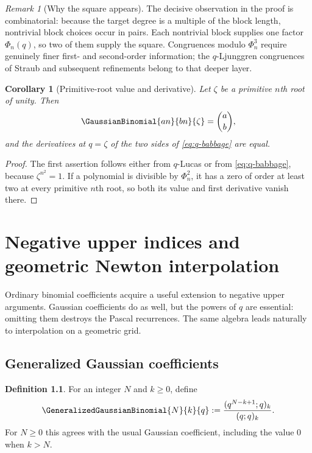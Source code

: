 \documentclass[11pt,a4paper,oneside,openany]{book}
\newtheorem{corollary}[corollary]{Corollary}
\theoremstyle{definition}
\newtheorem{definition}[definition]{Definition}
\theoremstyle{remark}
\newtheorem{remark}[remark]{Remark}
\begin{document}
\begin{remark}[Why the square appears]
The decisive observation in the proof is combinatorial: because the target degree is a multiple of the block length, nontrivial block choices occur in pairs.  Each nontrivial block supplies one factor $\Phi_n(q)$, so two of them supply the square.  Congruences modulo $\Phi_n^3$ require genuinely finer first- and second-order information; the $q$-Ljunggren congruences of Straub and subsequent refinements belong to that deeper layer.
\end{remark}

\begin{corollary}[Primitive-root value and derivative]\label{cor:babbage-derivative}
Let $\zeta$ be a primitive $n$th root of unity.  Then
\[
 \GaussianBinomial{an}{bn}{\zeta}=\binom ab,
\]
and the derivatives at $q=\zeta$ of the two sides of \eqref{eq:q-babbage} are equal.
\end{corollary}

\begin{proof}
The first assertion follows either from $q$-Lucas or from \eqref{eq:q-babbage}, because $\zeta^{n^2}=1$.  If a polynomial is divisible by $\Phi_n^2$, it has a zero of order at least two at every primitive $n$th root, so both its value and first derivative vanish there.
\end{proof}

\chapter{Negative upper indices and geometric Newton interpolation}\label{chap:qnewton}

Ordinary binomial coefficients acquire a useful extension to negative upper arguments.  Gaussian coefficients do as well, but the powers of $q$ are essential: omitting them destroys the Pascal recurrences.  The same algebra leads naturally to interpolation on a geometric grid.

\section{Generalized Gaussian coefficients}

\begin{definition}
For an integer $N$ and $k\ge0$, define
\[
 \GeneralizedGaussianBinomial{N}{k}{q}
 :=\frac{(q^{N-k+1};q)_k}{(q;q)_k}.
 \label{eq:generalized-gaussian}
\]
For $N\ge0$ this agrees with the usual Gaussian coefficient, including the value $0$ when $k>N$.
\end{definition}
\end{document}
